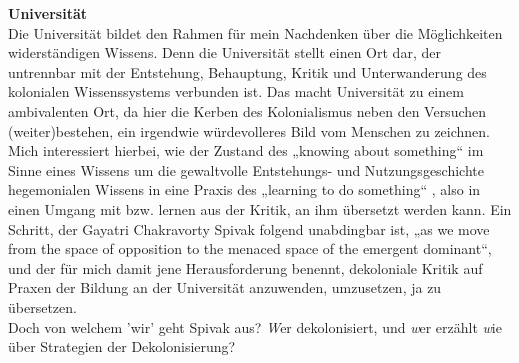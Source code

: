 \noindent\textbf{\large Universität}\\
Die Universität bildet den Rahmen für mein Nachdenken über die Möglichkeiten
widerständigen Wissens. Denn die Universität stellt einen Ort dar, der
untrennbar mit der Entstehung, Behauptung, Kritik und Unterwanderung des
kolonialen Wissenssystems verbunden ist.\footnotemark{}
Das macht Universität zu einem ambivalenten Ort, da hier die Kerben des
Kolonialismus neben den Versuchen (weiter)bestehen, ein irgendwie würdevolleres
Bild vom Menschen zu zeichnen.\\
Mich interessiert hierbei, wie der Zustand des „knowing about
something“\footnotemark {} im
Sinne eines Wissens um die gewaltvolle Entstehungs- und Nutzungsgeschichte
hegemonialen Wissens in eine Praxis des „learning to do something“\footnotemark
{}, also in einen Umgang mit bzw. lernen aus der Kritik, an
ihm übersetzt werden kann. Ein Schritt, der Gayatri Chakravorty Spivak folgend
unabdingbar ist, „as we move from the space of opposition to the menaced space
of the emergent dominant“\footnotemark{}, und der für mich damit jene Herausforderung
benennt, dekoloniale Kritik auf Praxen der Bildung an der Universität
anzuwenden, umzusetzen, ja zu übersetzen.\\
Doch von welchem 'wir' geht Spivak
aus? \textit{W}er dekolonisiert, und \textit{w}er erzählt \textit{w}ie über Strategien der
Dekolonisierung?\\

